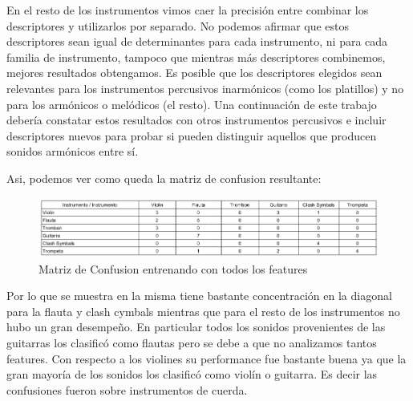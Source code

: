 En el resto de los instrumentos vimos caer la precisión entre combinar los descriptores y utilizarlos por separado. No podemos afirmar que estos descriptores sean igual de determinantes para cada instrumento, ni para cada familia de instrumento, tampoco que mientras más descriptores combinemos, mejores resultados obtengamos. Es posible que los descriptores elegidos sean relevantes para los instrumentos percusivos inarmónicos (como los platillos) y no para los armónicos o melódicos (el resto). Una continuación de este trabajo debería constatar estos resultados con otros instrumentos percusivos e incluir descriptores nuevos para probar si pueden distinguir aquellos que producen sonidos armónicos entre sí.

Asi, podemos ver como queda la matriz de confusion resultante:

\begin{figure}[h!]
    \centering
    \includegraphics[scale=0.5]{Content/Figures/matriz-de-confusion.png}
    \caption{Matriz de Confusion entrenando con todos los features}
    \label{fig:my_label}
\end{figure}

Por lo que se muestra en la misma tiene bastante concentración en la diagonal para la flauta y clash cymbals mientras que para el resto de los instrumentos no hubo un gran desempeño. En particular todos los sonidos provenientes de las guitarras los clasificó como flautas pero se debe a que no analizamos tantos features. Con respecto a los violines su performance fue bastante buena ya que la gran mayoría de los sonidos los clasificó como violín o guitarra. Es decir las confusiones fueron sobre instrumentos de cuerda.